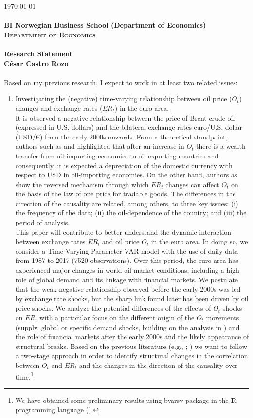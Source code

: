 \documentclass{article}\usepackage[]{graphicx}\usepackage[]{color}
\begin{document}
\today{}
\\
\\
\textbf{BI Norwegian Business School (Department of Economics)}\\
\textsc\textbf{Department of Economics}\\
\\
\textbf{Research Statement}\\
\textbf{César Castro Rozo}\\
\\


Based on my previous research, I expect to work in at least two related issues:

\begin{enumerate}
  \item Investigating the (negative) time-varying relationship between oil price ($O_t$) changes and exchange rates ($ER_t$) in the euro area.\\
  It is observed a negative relationship between the price of Brent crude oil (expressed in U.S. dollars) and the bilateral exchange rates euro/U.S. dollar (USD/\euro) from the early 2000s onwards. From a theoretical standpoint, authors such as \cite{Golub1983} and \cite{Krugman1983} highlighted that after an increase in $O_t$ there is a wealth transfer from oil-importing economies to oil-exporting countries and consequently, it is expected a depreciation of the domestic currency with respect to USD in oil-importing economies. On the other hand, authors as \cite{Blomberg1995} show the reversed mechanism through which $ER_t$ changes can affect $O_t$ on the basis of the law of one price for tradable goods. The differences in the direction of the causality are related, among others, to three key issues: (i) the frequency of the data; (ii) the oil-dependence of the country; and (iii) the period of analysis.\\
  This paper will contribute to better understand the dynamic interaction between exchange rates $ER_t$ and oil price $O_t$ in the euro area. In doing so, we consider a Time-Varying Parameter VAR model with the use of daily data from 1987 to 2017 (7520 observations). Over this period, the euro area has experienced major changes in world oil market conditions, including a high role of global demand and its linkage with financial markets. We postulate that the weak negative relationship observed before the early 2000s was led by exchange rate shocks, but the sharp link found later has been driven by oil price shocks. We analyze the potential differences of the effects of $O_t$ shocks on $ER_t$ with a particular focus on the different origin of the $O_t$ movements (supply, global or specific demand shocks, building on the analysis in \citealp{Kilian2009}) and the role of financial markets after the early 2000s and the likely appearance of structural breaks. Based on the previous literature (e.g., \citealp{Granger1969}; \citealp{Primiceri2005}) we want to follow a two-stage approach in order to identify structural changes in the correlation between $O_t$ and $ER_t$ and the changes in the direction of the causality over time.\footnote{We have obtained some preliminary results using bvarsv package in the \textbf{\textsf{R}} programming language (\citealp{Krueger2015}).}
  

\end{enumerate}
\end{document}
